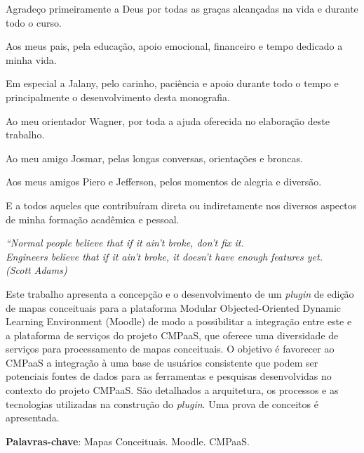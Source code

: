 \documentclass[
	12pt,				%
	openright,			%
	oneside,			%
	a4paper,			%
	english,			%
	french,				%
	spanish,			%
	brazil				%
	]{abntex2}
\begin{document}
\begin{agradecimentos}
	
Agradeço primeiramente a Deus por todas as graças alcançadas na vida e durante todo o curso.

Aos meus pais, pela educação, apoio emocional, financeiro e tempo dedicado a minha vida. 

Em especial a Jalany, pelo carinho, paciência e apoio durante todo o tempo e principalmente o desenvolvimento desta monografia.

Ao meu orientador Wagner, por toda a ajuda oferecida no elaboração deste trabalho.
 
Ao meu amigo Josmar, pelas longas conversas, orientações e broncas.

Aos meus amigos Piero e Jefferson, pelos momentos de alegria e diversão.

E a todos aqueles que contribuíram direta ou indiretamente nos diversos aspectos de
minha formação acadêmica e pessoal.

\end{agradecimentos}

\begin{epigrafe}
     \vspace*{\fill}
 	\begin{flushright}
 		\textit{``Normal people believe that if it ain't broke, don't fix it.\\ Engineers believe that if it ain't broke, it doesn't have enough features yet.\\
 		(Scott Adams)}
 	\end{flushright}
 \end{epigrafe}


\setlength{\absparsep}{18pt} %
\begin{resumo}
Este trabalho  apresenta a concepção e o desenvolvimento de um \textit{plugin} de edição de mapas conceituais para a plataforma Modular Objected-Oriented Dynamic Learning Environment (Moodle) de modo a possibilitar a integração  entre este e a plataforma  de serviços do projeto CMPaaS,  que oferece uma diversidade de serviços para processamento  de mapas conceituais. O objetivo é favorecer ao CMPaaS a integração à uma base de usuários consistente que podem ser potenciais fontes de dados para as ferramentas  e pesquisas desenvolvidas no contexto do projeto CMPaaS. São detalhados a arquitetura, os processos e as tecnologias utilizadas na construção do \textit{plugin}. Uma prova de conceitos é apresentada.
	
 \textbf{Palavras-chave}: Mapas Conceituais. Moodle. CMPaaS.
\end{resumo}
\end{document}
